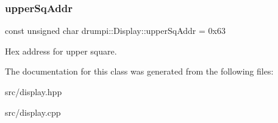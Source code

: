 \subsubsection{\texorpdfstring{upper\+Sq\+Addr}{upperSqAddr}}
{\footnotesize\ttfamily const unsigned char drumpi\+::\+Display\+::upper\+Sq\+Addr = 0x63\hspace{0.3cm}{\ttfamily [private]}}

Hex address for upper square. 

The documentation for this class was generated from the following files\+:\begin{DoxyCompactItemize}
\item 
src/display.\+hpp\item 
src/display.\+cpp\end{DoxyCompactItemize}
